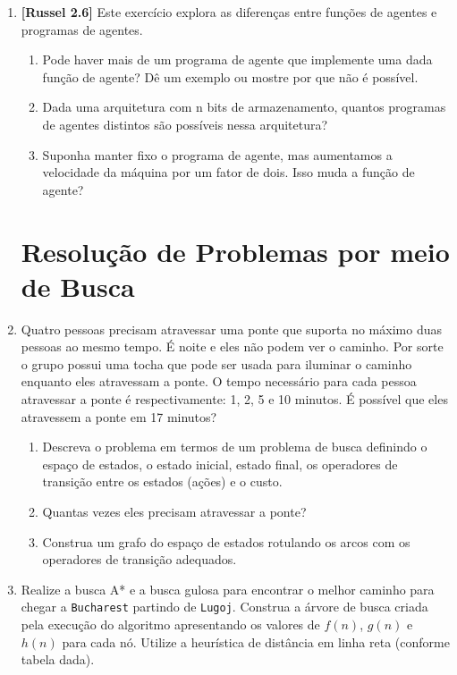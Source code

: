 \documentclass[12pt,a4paper,oneside]{article}
\begin{document}
\begin{enumerate}
	\item {\bf [Russel 2.6]} Este exercício explora as diferenças entre funções de agentes e programas de agentes.
		\begin{enumerate}
			\item Pode haver mais de um programa de agente que implemente uma dada função de agente? Dê um exemplo ou mostre por que não é possível.
			\item Dada uma arquitetura com n bits de armazenamento, quantos programas de agentes distintos são possíveis nessa arquitetura?
			\item Suponha manter fixo o programa de agente, mas aumentamos a velocidade da máquina por um fator de dois. Isso muda a função de agente?
		\end{enumerate}
	
	\section{Resolução de Problemas por meio de Busca}
	
	\item Quatro pessoas precisam atravessar uma ponte que suporta no máximo duas pessoas ao mesmo tempo. É noite e eles não podem ver o caminho. Por sorte o grupo possui uma tocha que pode ser usada para iluminar o caminho enquanto eles atravessam a ponte. O tempo necessário para cada pessoa atravessar a ponte é respectivamente: 1, 2, 5 e 10 minutos. É possível que eles atravessem a ponte em 17 minutos?
	
		\begin{enumerate}
			\item Descreva o problema em termos de um problema de busca definindo o espaço de estados, o estado inicial, estado final, os operadores de transição entre os estados (ações) e o custo.
			\item Quantas vezes eles precisam atravessar a ponte?
			\item Construa um grafo do espaço de estados rotulando os arcos com os operadores de transição adequados.
		\end{enumerate}
	
	\item Realize a busca A* e a busca gulosa para encontrar o melhor caminho para chegar a {\tt Bucharest} partindo de {\tt Lugoj}. Construa a árvore de busca criada pela execução do algoritmo apresentando os valores de $f(n)$, $g(n)$ e $h(n)$ para cada nó. Utilize a heurística de distância em linha reta (conforme tabela dada).
	

\end{enumerate}
\end{document}
